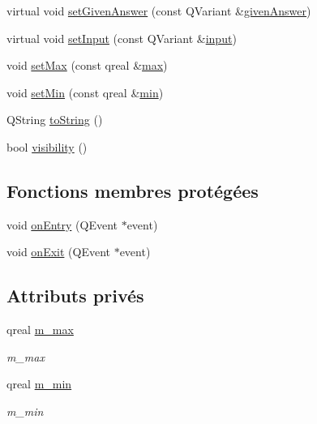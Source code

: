 \begin{DoxyCompactItemize}
\item 
virtual void \hyperlink{classSH__QuestionState_a8fec0a91aed0b2b1699db17169873eb0}{set\-Given\-Answer} (const Q\-Variant \&\hyperlink{classSH__QuestionState_a29cdea8bc55e39e3ed02d24743c30f8c}{given\-Answer})
\item 
virtual void \hyperlink{classSH__QuestionState_ab40b6202090d1afcc965e124b2deb88a}{set\-Input} (const Q\-Variant \&\hyperlink{classSH__InOutState_a8e1b78069343122df7713624a1a5a100}{input})
\item 
void \hyperlink{classSH__DecimalQuestionState_a5b7b0e27a5a89424c36e1bef77fdd062}{set\-Max} (const qreal \&\hyperlink{classSH__DecimalQuestionState_a17bd2b3f5766c5379d7f057d7d4aa178}{max})
\item 
void \hyperlink{classSH__DecimalQuestionState_a2b0fa48a8e0609bb2db7776ce1240a86}{set\-Min} (const qreal \&\hyperlink{classSH__DecimalQuestionState_ac909214eeb0e370c16718cb698bfec2c}{min})
\item 
Q\-String \hyperlink{classSH__GenericState_a7779babbb40f3f8faa71112204d9804f}{to\-String} ()
\item 
bool \hyperlink{classSH__InOutState_a3a18752c4122c26a2ebf38310c9c1b75}{visibility} ()
\end{DoxyCompactItemize}
\subsection*{Fonctions membres protégées}
\begin{DoxyCompactItemize}
\item 
void \hyperlink{classSH__GenericState_a68c67ef95738e01cd34cd5926f4932fb}{on\-Entry} (Q\-Event $\ast$event)
\item 
void \hyperlink{classSH__GenericState_a7f7863859318c70c9b734be5bf5510b0}{on\-Exit} (Q\-Event $\ast$event)
\end{DoxyCompactItemize}
\subsection*{Attributs privés}
\begin{DoxyCompactItemize}
\item 
qreal \hyperlink{classSH__DecimalQuestionState_a9f5763fb66d1c8c2fcdf6b5403d51579}{m\-\_\-max}
\begin{DoxyCompactList}\small\item\em m\-\_\-max \end{DoxyCompactList}\item 
qreal \hyperlink{classSH__DecimalQuestionState_a997b3644b15e2f221e5d68e2ce14a882}{m\-\_\-min}
\begin{DoxyCompactList}\small\item\em m\-\_\-min \end{DoxyCompactList}\end{DoxyCompactItemize}


